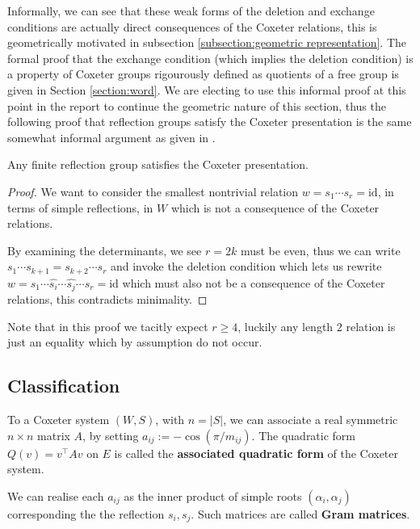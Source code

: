 \documentclass[../main.tex]{subfiles}
\begin{document}
Informally, we can see that these weak forms of the deletion and exchange conditions are actually direct consequences of the Coxeter relations, this is geometrically motivated in subsection \ref{subsection:geometric representation}. The formal proof that the exchange condition (which implies the deletion condition) is a property of Coxeter groups rigourously defined as quotients of a free group is given in Section \ref{section:word}. We are electing to use this informal proof at this point in the report to continue the geometric nature of this section, thus the following proof that reflection groups satisfy the Coxeter presentation is the same somewhat informal argument as given in \cite{Humphreys1990}.

\begin{theorem}
    Any finite reflection group satisfies the Coxeter presentation.
    \begin{proof}
        We want to consider the smallest nontrivial relation $w=s_1\cdots s_r = \text{id}$, in terms of simple reflections, in $W$ which is not a consequence of the Coxeter relations.

        By examining the determinants, we see $r=2k$ must be even, thus we can write $s_1\cdots s_{k+1} = s_{k+2}\cdots s_r$ and invoke the deletion condition which lets us rewrite $w=s_1\cdots \hat{s_i}\cdots \hat{s_j}\cdots s_r =\text{id}$ which must also not be a consequence of the Coxeter relations, this contradicts minimality.
    \end{proof}
\end{theorem}

Note that in this proof we tacitly expect $r\geq 4$, luckily any length $2$ relation is just an equality which by assumption do not occur.

\subsection{Classification}\label{subsection:classification}

\begin{definition}
    To a Coxeter system $(W,S)$, with $n=|S|$, we can associate a real symmetric $n\times n$ matrix $A$, by setting $a_{ij}:= -\cos(\pi/m_{ij})$. The quadratic form $Q(v) = v^\top A v$ on $E$ is called the \textbf{associated quadratic form} of the Coxeter system.
\end{definition}

We can realise each $a_{ij}$ as the inner product of simple roots $(\alpha_i,\alpha_j)$ corresponding the the reflection $s_i,s_j$. Such matrices are called \textbf{Gram matrices}.
\end{document}
